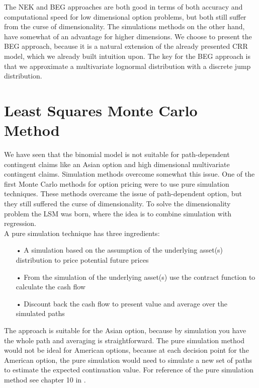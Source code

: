 The NEK and BEG approaches are both good in terms of both accuracy and computational speed for low dimensional option problems, but both still suffer from the curse of dimensionality. The simulations methods on the other hand, have somewhat of an advantage for higher dimensions. We choose to present the BEG approach, because it is a natural extension of the already presented CRR model, which we already built intuition upon. The key for the BEG approach is that we approximate a multivariate lognormal distribution with a discrete jump distribution. 

\newpage

\section{Least Squares Monte Carlo Method}\label{LSM}
We have seen that the binomial model is not suitable for path-dependent contingent claims like an Asian option and high dimensional multivariate contingent claims. Simulation methods overcome somewhat this issue. One of the first Monte Carlo methods for option pricing were to use pure simulation techniques. These methods overcame the issue of path-dependent option, but they still suffered the curse of dimensionality. To solve the dimensionality problem the LSM was born, where the idea is to combine simulation with regression. \\

A pure simulation technique has three ingredients: 
\begin{enumerate}
\item[•] A simulation based on the assumption of the underlying asset(s) distribution to price potential future prices
\item[•] From the simulation of the underlying asset(s) use the contract function to calculate the cash flow
\item[•] Discount back the cash flow to present value and average over the simulated paths
\end{enumerate}
The approach is suitable for the Asian option, because by simulation you have the whole path and averaging is straightforward. The pure simulation method would not be ideal for American options, because at each decision point for the American option, the pure simulation would need to simulate a new set of paths to estimate the expected continuation value. For reference of the pure simulation method see chapter 10 in \parencite{OVERHAUSMARCUS2007EHD}.\\ 

